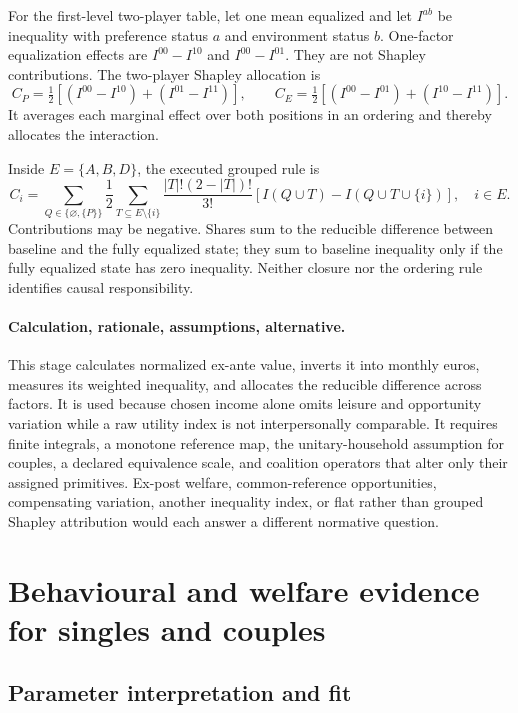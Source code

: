 \documentclass[11pt,a4paper]{article}
\begin{document}
For the first-level two-player table, let one mean equalized and let $I^{ab}$ be
inequality with preference status $a$ and environment status $b$. One-factor
equalization effects are $I^{00}-I^{10}$ and $I^{00}-I^{01}$. They are not
Shapley contributions. The two-player Shapley allocation is
\begin{equation}
C_P=\tfrac12[(I^{00}-I^{10})+(I^{01}-I^{11})],\qquad
C_E=\tfrac12[(I^{00}-I^{01})+(I^{10}-I^{11})].
\label{eq:twoplayer}
\end{equation}
It averages each marginal effect over both positions in an ordering and thereby
allocates the interaction.

Inside $E=\{A,B,D\}$, the executed grouped rule is
\begin{equation}
C_i=\sum_{Q\in\{\varnothing,\{P\}\}}\frac12
\sum_{T\subseteq E\setminus\{i\}}
\frac{|T|!(2-|T|)!}{3!}
\left[I(Q\cup T)-I(Q\cup T\cup\{i\})\right],
\quad i\in E.
\label{eq:owen}
\end{equation}
Contributions may be negative. Shares sum to the reducible difference between
baseline and the fully equalized state; they sum to baseline inequality only if
the fully equalized state has zero inequality. Neither closure nor the ordering
rule identifies causal responsibility.

\paragraph{Calculation, rationale, assumptions, alternative.}
This stage calculates normalized ex-ante value, inverts it into monthly euros,
measures its weighted inequality, and allocates the reducible difference across
factors. It is used because chosen income alone omits leisure and opportunity
variation while a raw utility index is not interpersonally comparable. It
requires finite integrals, a monotone reference map, the unitary-household
assumption for couples, a declared equivalence scale, and coalition operators
that alter only their assigned primitives. Ex-post welfare, common-reference
opportunities, compensating variation, another inequality index, or flat rather
than grouped Shapley attribution would each answer a different normative
question.

\section{Behavioural and welfare evidence for singles and couples}

\subsection{Parameter interpretation and fit}
\end{document}
